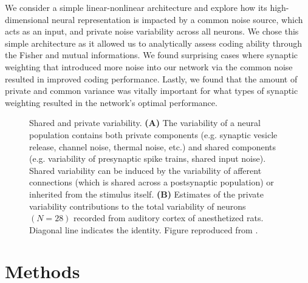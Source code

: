 \documentclass[12pt]{article}
\begin{document}
We consider a simple linear-nonlinear architecture and explore how its high-dimensional neural representation is impacted by a common noise source, which acts as an input, and private noise variability across all neurons. We chose this simple architecture as it allowed us to analytically assess coding ability through the Fisher and mutual informations. We found surprising cases where synaptic weighting that introduced more noise into our network via the common noise resulted in improved coding performance. Lastly, we found that the amount of private and common variance was vitally important for what types of synaptic weighting resulted in the network's optimal performance.
\begin{figure}[b]
	\centering
	\caption{Shared and private variability. \textbf{(A)} The variability of a neural population contains both private components (e.g. synaptic vesicle release, channel noise, thermal noise, etc.) and shared components (e.g. variability of presynaptic spike trains, shared input noise). Shared variability can be induced by the variability of afferent connections (which is shared across a postsynaptic population) or inherited from the stimulus itself.  \textbf{(B)} Estimates of the private variability contributions to the total variability of neurons $(N=28)$ recorded from auditory cortex of anesthetized rats. Diagonal line indicates the identity. Figure reproduced from \cite{deweese2004}.}
	\label{fig:private-shared}
\end{figure}

\section{Methods}
\end{document}

